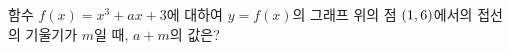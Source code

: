 함수 $f(x)=x^3+ax+3$에 대하여 $y=f(x)$의 그래프 위의 점 $(1{,}\mkern3mu\mathopen{}6)$에서의 접선의 기울기가 $m$일 때, $a+m$의 값은? 
